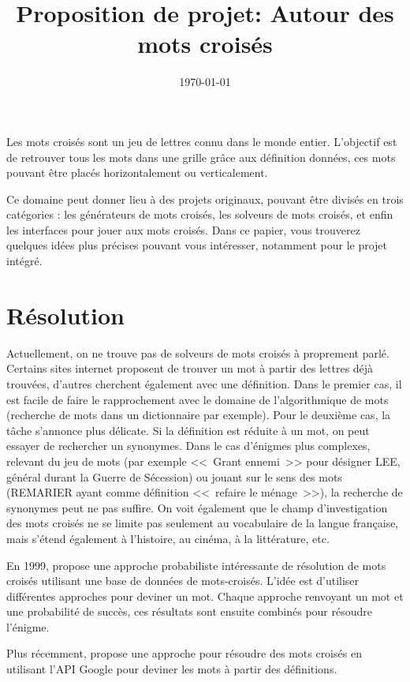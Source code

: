 \documentclass{article}
\title{Proposition de projet: Autour des mots croisés}
\author{}
\date{\today}
\begin{document}
\maketitle

Les mots croisés sont un jeu de lettres connu dans le monde entier. L'objectif est de retrouver tous les mots dans une grille grâce aux définition données, ces mots pouvant être placés horizontalement ou verticalement.

Ce domaine peut donner lieu à des projets originaux, pouvant être divisés en trois catégories : les générateurs de mots croisés, les solveurs de mots croisés, et enfin les interfaces pour jouer aux mots croisés. Dans ce papier, vous trouverez quelques idées plus précises pouvant vous intéresser, notamment pour le projet intégré.

\section{Résolution}

Actuellement, on ne trouve pas de solveurs de mots croisés à proprement parlé. Certains sites internet proposent de trouver un mot à partir des lettres déjà trouvées, d'autres cherchent également avec une définition. Dans le premier cas, il est facile de faire le rapprochement avec le domaine de l'algorithmique de mots (recherche de mots dans un dictionnaire par exemple). Pour le deuxième cas, la tâche s'annonce plus délicate. Si la définition est réduite à un mot, on peut essayer de rechercher un synonymes. Dans le cas d'énigmes plus complexes, relevant du jeu de mots (par exemple <<~Grant ennemi~>> pour désigner LEE, général durant la Guerre de Sécession) ou jouant sur le sens des mots (REMARIER ayant comme définition <<~refaire le ménage~>>), la recherche de synonymes peut ne pas suffire. On voit également que le champ d'investigation des mots croisés ne se limite pas seulement au vocabulaire de la langue française, mais s'étend également à l'histoire, au cinéma, à la littérature, etc.

En 1999, \cite{proverb} propose une approche probabiliste intéressante de résolution de mots croisés utilisant une base de données de mots-croisés. L'idée est d'utiliser différentes approches pour deviner un mot. Chaque approche renvoyant un mot et une probabilité de succès, ces résultats sont ensuite combinés pour résoudre l'énigme.

Plus récemment, \cite{GCV} propose une approche pour résoudre des mots croisés en utilisant l'API Google pour deviner les mots à partir des définitions.
\end{document}
